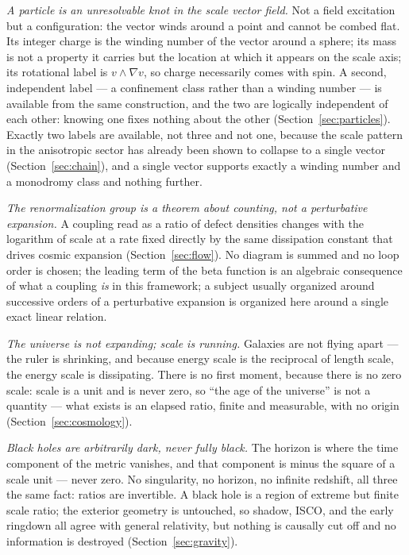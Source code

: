 \documentclass[pdflatex,sn-mathphys-num]{sn-jnl}
\theoremstyle{thmstyleone}
\theoremstyle{thmstylethree}
\theoremstyle{thmstyletwo}
\begin{document}
\emph{A particle is an unresolvable knot in the scale vector field.} Not
a field excitation but a configuration: the vector winds around a point
and cannot be combed flat. Its integer charge is the winding number of
the vector around a sphere; its mass is not a property it carries but
the location at which it appears on the scale axis; its rotational label
is $v \wedge \nabla v$, so charge necessarily comes with spin. A second,
independent label — a confinement class rather than a winding number —
is available from the same construction, and the two are logically
independent of each other: knowing one fixes nothing about the other
(Section~\ref{sec:particles}). Exactly two labels are available, not
three and not one, because the scale pattern in the anisotropic sector
has already been shown to collapse to a single vector
(Section~\ref{sec:chain}), and a single vector supports exactly a
winding number and a monodromy class and nothing further.

\emph{The renormalization group is a theorem about counting, not a
perturbative expansion.} A coupling read as a ratio of defect densities
changes with the logarithm of scale at a rate fixed directly by the same
dissipation constant that drives cosmic expansion (Section~\ref{sec:flow}).
No diagram is summed and no loop order is chosen; the leading term of
the beta function is an algebraic consequence of what a coupling
\emph{is} in this framework; a subject usually organized around
successive orders of a perturbative expansion is organized here around a
single exact linear relation.

\emph{The universe is not expanding; scale is running.} Galaxies are not
flying apart — the ruler is shrinking, and because energy scale is the
reciprocal of length scale, the energy scale is dissipating. There is no
first moment, because there is no zero scale: scale is a unit and is
never zero, so ``the age of the universe'' is not a quantity — what
exists is an elapsed ratio, finite and measurable, with no origin
(Section~\ref{sec:cosmology}).

\emph{Black holes are arbitrarily dark, never fully black.} The horizon
is where the time component of the metric vanishes, and that component
is minus the square of a scale unit — never zero. No singularity, no
horizon, no infinite redshift, all three the same fact: ratios are
invertible. A black hole is a region of extreme but finite scale ratio;
the exterior geometry is untouched, so shadow, ISCO, and the early
ringdown all agree with general relativity, but nothing is causally cut
off and no information is destroyed (Section~\ref{sec:gravity}).
\end{document}
